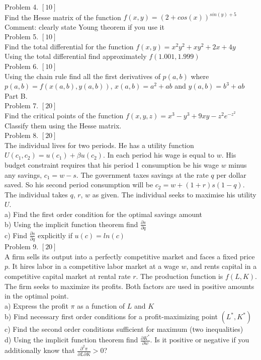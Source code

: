 \documentclass[pdftex,12pt,a4paper]{article}
\begin{document}
Problem 4. $[10]$ \\
Find the Hesse matrix of the function $f(x,y)=(2+cos(x))^{sin(y)+5}$\\
Comment: clearly state Young theorem if you use it \\

Problem 5. $[10]$ \\
Find the total differential for the function $f(x,y)=x^2y^2+xy^2+2x+4y$\\
Using the total differential find approximately $f(1.001,1.999)$ \\

Problem 6. $[10]$ \\
Using the chain rule find all the first derivatives of  $p(a,b)$ where $p(a,b)=f(x(a,b),y(a,b))$, $x(a,b)=a^2+ab$ and $y(a,b)=b^3+ab$ \\


Part B. \\

Problem 7. $[20]$ \\
Find the critical points of the function $f(x,y,z)=x^3-y^3+9xy-z^2e^{-z^2}$\\
Classify them using the Hesse matrix. \\

Problem 8. $[20]$ \\
The individual lives for two periods.  He has a utility function $U(c_{1},c_{2})=u(c_{1})+\beta u(c_{2})$. In each period his wage is equal to $w$. His budget constraint requires that his period 1 consumption be his wage $w$ minus any savings, $c_{1}=w-s$. The government taxes savings at the rate $q$ per dollar saved. So his second period consumption will be $c_{2}= w + (1+ r)s(1-q)$.  The individual takes $q$, $r$, $w$ as given. The individual seeks to maximise his utility $U$.\\
a)	Find the first order condition for the optimal savings amount\\
b)	Using the implicit function theorem find $\frac{\partial s}{\partial q}$\\
c)	Find $\frac{\partial s}{\partial q}$ explicitly if $u(c)=ln(c)$\\

Problem 9. $[20]$ \\
A firm sells its output into a perfectly competitive market and faces a fixed price $p$. It hires labor in a competitive labor market at a wage $w$, and rents capital in a competitive capital market at rental rate $r$. The production function is $f(L, K)$. The firm seeks to maximize its profits. Both factors are used in positive amounts in the optimal point. \\
a)	Express the profit $\pi$ as a function of $L$ and $K$\\
b)	Find necessary first order conditions for a profit-maximizing point $(L^{*},K^{*})$\\
c)	Find the second order conditions sufficient for maximum (two inequalities)\\
d)	Using the implicit function theorem find $\frac{\partial K^{*}}{\partial w}$.  Is it positive or negative if you additionally know that $\frac{\partial^{2}\pi}{\partial L\partial K}>0$?\\
\end{document}
